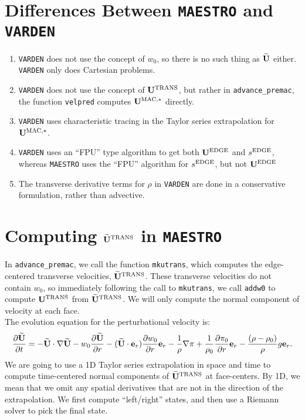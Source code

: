 \documentclass[11pt]{article}
\def\edge  {\rm EDGE}
\def\mac   {\rm MAC}
\def\trans {\rm TRANS}
\def\eb    {{\bf e}}
\def\Ub    {{\bf U}}
\def\Ubt   {\widetilde{\bf U}}
\begin{document}
\section{Differences Between {\tt MAESTRO} and {\tt VARDEN}}
\begin{enumerate}
\item {\tt VARDEN} does not use the concept of $w_0$, so there is no such thing as $\Ubt$ either.  {\tt VARDEN} only does Cartesian problems.
\item {\tt VARDEN} does not use the concept of $\Ub^{\trans}$, but rather in {\tt advance\_premac}, the function {\tt velpred} computes $\Ub^{\mac,*}$ directly.
\item {\tt VARDEN} uses characteristic tracing in the Taylor series extrapolation for $\Ub^{\mac,*}$.
\item {\tt VARDEN} uses an ``FPU'' type algorithm to get both $\Ub^{\edge}$ and $s^{\edge}$, whereas {\tt MAESTRO} uses the ``FPU'' algorithm for $s^{\edge}$, but not $\Ub^{\edge}$
\item The transverse derivative terms for $\rho$ in {\tt VARDEN} are done in a conservative formulation, rather than advective.
\end{enumerate}
\cleardoublepage
\section{Computing $\Ubt^{\trans}$ in {\tt MAESTRO}}
In {\tt advance\_premac}, we call the function {\tt mkutrans}, which computes the edge-centered transverse velocities, $\Ubt^{\trans}$.  These transverse velocities do not contain $w_0$, so immediately following the call to {\tt mkutrans}, we call {\tt addw0} to compute $\Ub^{\trans}$ from $\Ubt^{\trans}$.  We will only compute the normal component of velocity at each face.\\

The evolution equation for the perturbational velocity is:
\begin{equation}
\frac{\partial\Ubt}{\partial t} = -\Ubt\cdot\nabla\Ubt - w_0\frac{\partial\Ubt}{\partial r} - (\Ubt\cdot\eb_r)\frac{\partial w_0}{\partial r}\eb_r - \frac{1}{\rho}\nabla\pi + \frac{1}{\rho_0}\frac{\partial\pi_0}{\partial r}\eb_r - \frac{(\rho-\rho_0)}{\rho}g\eb_r.\label{Perturbational Velocity Equation}
\end{equation}
We are going to use a 1D Taylor series extrapolation in space and time to compute time-centered normal components of $\Ubt^{\trans}$ at face-centers.  By 1D, we mean that we omit any spatial derivatives that are not in the direction of the extrapolation.  We first compute ``left/right'' states, and then use a Riemann solver to pick the final state.
\end{document}
